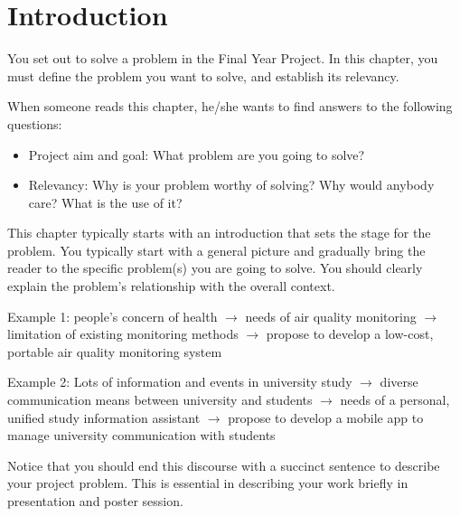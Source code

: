 \documentclass[11pt,a4paper]{article}
\begin{document}

\begingroup
{}          %
\setlength{\parskip}{0pt} %
\tableofcontents
\endgroup
\clearpage
\begingroup
\setlength{\parskip}{0pt}
\listoffigures
\endgroup
\clearpage
\begingroup
\setlength{\parskip}{0pt}
\listoftables
\endgroup
\clearpage
\section{Introduction}
\label{sec:intro}

You set out to solve a problem in the Final Year Project. In this chapter, you must define the problem you want to solve, and establish its relevancy.

When someone reads this chapter, he/she wants to find answers to the following questions:
\begin{itemize}
  \item Project aim and goal: What problem are you going to solve?
  \item Relevancy: Why is your problem worthy of solving? Why would anybody care? What is the use of it?
\end{itemize}

This chapter typically starts with an introduction that sets the stage for the problem. You typically start with a general picture and gradually bring the reader to the specific problem(s) you are going to solve. You should clearly explain the problem's relationship with the overall context.

Example 1: people's concern of health $\to$ needs of air quality monitoring $\to$ limitation of existing monitoring methods $\to$ propose to develop a low-cost, portable air quality monitoring system

Example 2: Lots of information and events in university study $\to$ diverse communication means between university and students $\to$ needs of a personal, unified study information assistant $\to$ propose to develop a mobile app to manage university communication with students

Notice that you should end this discourse with a succinct sentence to describe your project problem. This is essential in describing your work briefly in presentation and poster session.
\end{document}
